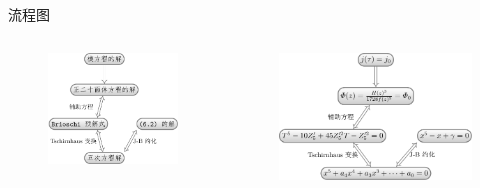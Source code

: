 \documentclass[pdf]{beamer}
\numberwithin{equation}{section}
\theoremstyle{plain}
\theoremstyle{plain}
\theoremstyle{remark}
\begin{document}
\begin{frame}[label=flowchart1]{流程图}
\begin{columns}
\begin{column}{0.4\textwidth}
	\begin{figure}[ht]
		\centering
		\includegraphics[scale=0.7]{Flowchart/Mainflowchart-1.pdf}
	\end{figure}
\end{column}
\begin{column}{0.6\textwidth}
	\begin{figure}[ht]
		\centering
		\includegraphics[scale=0.7]{Flowchart/Mainflowchart-2-1.pdf}
	\end{figure}
\end{column}
\end{columns}
\hspace{-1cm}\hyperlink{fifth}{}
\end{frame}
\end{document}
